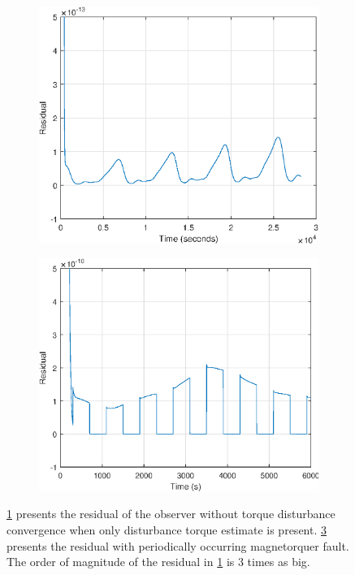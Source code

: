 
\begin{figure}[H]
	\begin{subfigure}{0.5\linewidth}
	\centering
	\includegraphics[width=1\linewidth]{figures/constdistonly_res}
	\label{fig:residualdist}	
	\caption{}
	\end{subfigure}
	\begin{subfigure}{0.5\linewidth}
	\centering
	\includegraphics[width=1\linewidth]{figures/mt_fault_res}
	\label{fig:residualmt}
	\caption{}
	\end{subfigure}
\caption{\ref{fig:residualdist} presents the residual of the observer without torque disturbance convergence when only disturbance torque estimate is present. \ref{fig:residualmt} presents the residual with periodically occurring magnetorquer fault. The order of magnitude of the residual in \ref{fig:residualdist} is 3 times as big.}
\end{figure}

